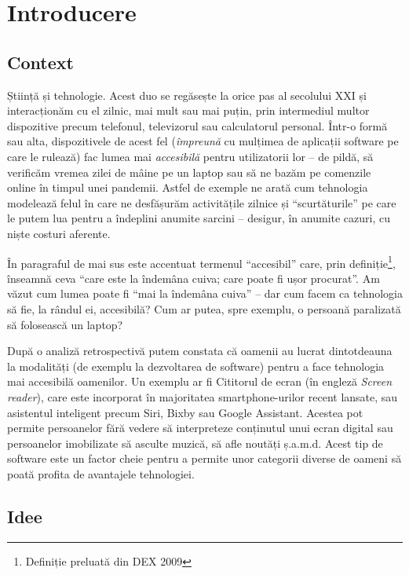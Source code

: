\chapter*{Introducere} 

\section*{Context}

Știință și tehnologie.
Acest duo se regăsește la orice pas al secolului XXI și interacționăm cu el zilnic, mai mult sau mai puțin, prin intermediul multor dispozitive precum telefonul, televizorul sau calculatorul personal.
Într-o formă sau alta, dispozitivele de acest fel (\emph{împreună} cu mulțimea de aplicații software pe care le rulează) fac lumea mai \emph{accesibilă} pentru utilizatorii lor – de pildă, să verificăm vremea zilei de mâine pe un laptop sau să ne bazăm pe comenzile online în timpul unei pandemii.
Astfel de exemple ne arată cum tehnologia modelează felul în care ne desfășurăm activitățile zilnice și ``scurtăturile'' pe care le putem lua pentru a îndeplini anumite sarcini – desigur, în anumite cazuri, cu niște costuri aferente.

În paragraful de mai sus este accentuat termenul ``accesibil'' care, prin definiție\footnote{Definiție preluată din DEX 2009}, înseamnă ceva ``care este la îndemâna cuiva; care poate fi ușor procurat''.
Am văzut cum lumea poate fi ``mai la îndemâna cuiva'' – dar cum facem ca tehnologia să fie, la rândul ei, accesibilă?
Cum ar putea, spre exemplu, o persoană paralizată să folosească un laptop?

După o analiză retrospectivă putem constata că oamenii au lucrat dintotdeauna la modalități (de exemplu la dezvoltarea de software) pentru a face tehnologia mai accesibilă oamenilor.
Un exemplu ar fi Cititorul de ecran (în engleză \emph{Screen reader}), care este incorporat în majoritatea smartphone-urilor recent lansate, sau asistentul inteligent precum Siri, Bixby sau Google Assistant.
Acestea pot permite persoanelor fără vedere să interpreteze conținutul unui ecran digital sau persoanelor imobilizate să asculte muzică, să afle noutăți ș.a.m.d.
Acest tip de software este un factor cheie pentru a permite unor categorii diverse de oameni să poată profita de avantajele tehnologiei.

\section*{Idee}

